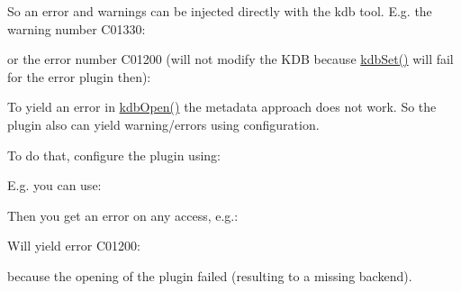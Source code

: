 So an error and warnings can be injected directly with the kdb tool. E.\+g. the warning number C01330\+:


\begin{DoxyCode}{0}
\end{DoxyCode}


or the error number C01200 (will not modify the K\+DB because {\ttfamily \mbox{\hyperlink{group__kdb_ga11436b058408f83d303ca5e996832bcf}{kdb\+Set()}}} will fail for the error plugin then)\+:


\begin{DoxyCode}{0}
\end{DoxyCode}


To yield an error in \mbox{\hyperlink{group__kdb_ga6808defe5870f328dd17910aacbdc6ca}{kdb\+Open()}} the metadata approach does not work. So the plugin also can yield warning/errors using configuration.

To do that, configure the plugin using\+:


\begin{DoxyCode}{0}
\end{DoxyCode}


E.\+g. you can use\+:


\begin{DoxyCode}{0}
\end{DoxyCode}


Then you get an error on any access, e.\+g.\+:


\begin{DoxyCode}{0}
\end{DoxyCode}


Will yield error C01200\+:


\begin{DoxyCode}{0}
\end{DoxyCode}


because the opening of the plugin failed (resulting to a missing backend). 